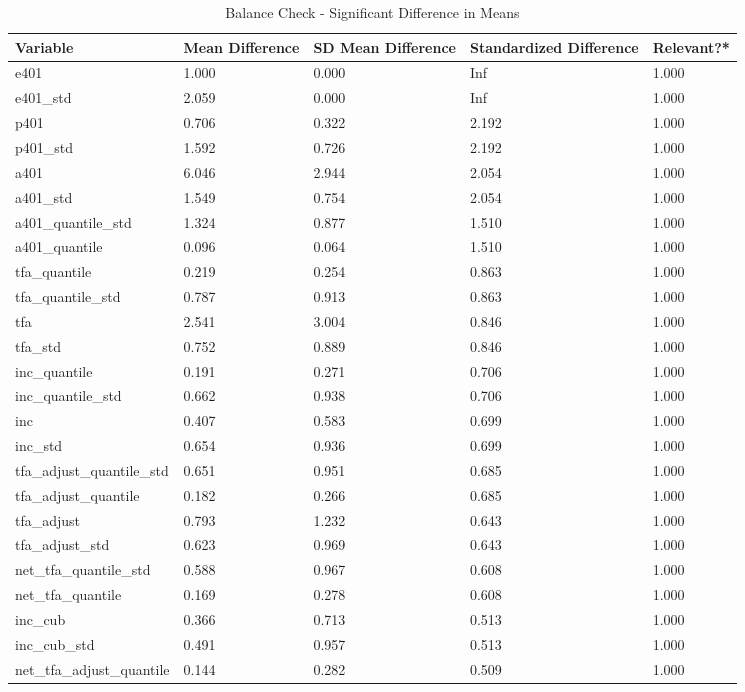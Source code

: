 \documentclass[12pt,a4paper]{article}
\begin{document}
\begin{singlespace}
\begin{ThreePartTable}
				\begin{longtable}{l C{2cm} C{2cm} C{2cm} C{2cm} }
					\caption{Balance Check - Significant Difference in Means}\label{tab_soep_transmission_all_controls}\\
			\toprule
			 Variable & Mean Difference & SD Mean Difference & Standardized Difference & Relevant?* \\ 
  \hline
  e401 & 1.000 & 0.000 &  Inf & 1.000 \\ 
  e401\_std & 2.059 & 0.000 &  Inf & 1.000 \\ 
  p401 & 0.706 & 0.322 & 2.192 & 1.000 \\ 
  p401\_std & 1.592 & 0.726 & 2.192 & 1.000 \\ 
  a401 & 6.046 & 2.944 & 2.054 & 1.000 \\ 
  a401\_std & 1.549 & 0.754 & 2.054 & 1.000 \\ 
  a401\_quantile\_std & 1.324 & 0.877 & 1.510 & 1.000 \\ 
  a401\_quantile & 0.096 & 0.064 & 1.510 & 1.000 \\ 
  tfa\_quantile & 0.219 & 0.254 & 0.863 & 1.000 \\ 
  tfa\_quantile\_std & 0.787 & 0.913 & 0.863 & 1.000 \\ 
  tfa & 2.541 & 3.004 & 0.846 & 1.000 \\ 
  tfa\_std & 0.752 & 0.889 & 0.846 & 1.000 \\ 
  inc\_quantile & 0.191 & 0.271 & 0.706 & 1.000 \\ 
  inc\_quantile\_std & 0.662 & 0.938 & 0.706 & 1.000 \\ 
  inc & 0.407 & 0.583 & 0.699 & 1.000 \\ 
  inc\_std & 0.654 & 0.936 & 0.699 & 1.000 \\ 
  tfa\_adjust\_quantile\_std & 0.651 & 0.951 & 0.685 & 1.000 \\ 
  tfa\_adjust\_quantile & 0.182 & 0.266 & 0.685 & 1.000 \\ 
  tfa\_adjust & 0.793 & 1.232 & 0.643 & 1.000 \\ 
  tfa\_adjust\_std & 0.623 & 0.969 & 0.643 & 1.000 \\ 
  net\_tfa\_quantile\_std & 0.588 & 0.967 & 0.608 & 1.000 \\ 
  net\_tfa\_quantile & 0.169 & 0.278 & 0.608 & 1.000 \\ 
  inc\_cub & 0.366 & 0.713 & 0.513 & 1.000 \\ 
  inc\_cub\_std & 0.491 & 0.957 & 0.513 & 1.000 \\ 
  net\_tfa\_adjust\_quantile & 0.144 & 0.282 & 0.509 & 1.000 \\ 

\end{longtable}
\end{ThreePartTable}
\end{singlespace}
\end{document}
